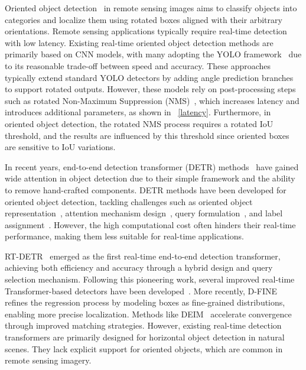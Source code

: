 \documentclass[lettersize,journal]{IEEEtran}
\begin{document}
Oriented object detection~\cite{orientedrcnn} in remote sensing images aims to classify objects into categories and localize them using rotated boxes aligned with their arbitrary orientations. Remote sensing applications typically require real-time detection with low latency. Existing real-time oriented object detection methods are primarily based on CNN models, with many adopting the YOLO framework~\cite{rtmdet,ppyoloer,yoloms} due to its reasonable trade-off between speed and accuracy. These approaches typically extend standard YOLO detectors by adding angle prediction branches to support rotated outputs. However, these models rely on post-processing steps such as rotated Non-Maximum Suppression (NMS)~\cite{nms}, which increases latency and introduces additional parameters, as shown in \figurename~\ref{latency}. Furthermore, in oriented object detection, the rotated NMS process requires a rotated IoU threshold, and the results are influenced by this threshold since oriented boxes are sensitive to IoU variations.

In recent years, end-to-end detection transformer (DETR) methods~\cite{detr} have gained wide attention in object detection due to their simple framework and the ability to remove hand-crafted components. 
DETR methods have been developed for oriented object detection, tackling challenges such as oriented object representation~\cite{orienteddetr}, attention mechanism design~\cite{arsdetr}, query formulation~\cite{rqformer}, and label assignment~\cite{rhino}.
However, the high computational cost often hinders their real-time performance, making them less suitable for real-time applications.


RT-DETR~\cite{rtdetr} emerged as the first real-time end-to-end detection transformer, achieving both efficiency and accuracy through a hybrid design and query selection mechanism. Following this pioneering work, several improved real-time Transformer-based detectors have been developed~\cite{rtdetrv2,rtdetrv3}. More recently, D-FINE~\cite{dfine} refines the regression process by modeling boxes as fine-grained distributions, enabling more precise localization. Methods like DEIM~\cite{deim} accelerate convergence through improved matching strategies. 
However, existing real-time detection transformers are primarily designed for horizontal object detection in natural scenes. They lack explicit support for oriented objects, which are common in remote sensing imagery.
\end{document}
